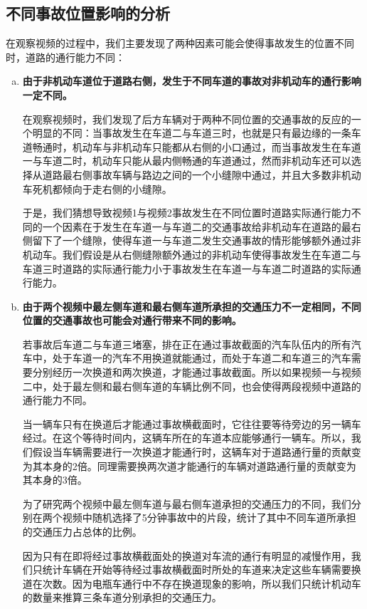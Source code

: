 \documentclass{cumcmart}
\begin{document}
\subsection{不同事故位置影响的分析}

在观察视频的过程中，我们主要发现了两种因素可能会使得事故发生的位置不同时，道路的通行能力不同：


\begin{enumerate}[a)]
\item \textbf{由于非机动车道位于道路右侧，发生于不同车道的事故对非机动车的通行影响一定不同。}

在观察视频时，我们发现了后方车辆对于两种不同位置的交通事故的反应的一个明显的不同：当事故发生在车道二与车道三时，也就是只有最边缘的一条车道畅通时，机动车与非机动车只能都从右侧的小口通过，而当事故发生在车道一与车道二时，机动车只能从最内侧畅通的车道通过，然而非机动车还可以选择从道路最右侧事故车辆与路边之间的一个小缝隙中通过，并且大多数非机动车死机都倾向于走右侧的小缝隙。

于是，我们猜想导致视频1与视频2事故发生在不同位置时道路实际通行能力不同的一个因素在于发生在车道一与车道二的交通事故给非机动车在道路的最右侧留下了一个缝隙，使得车道一与车道二发生交通事故的情形能够额外通过非机动车。我们假设是从右侧缝隙额外通过的非机动车使得事故发生在车道二与车道三时道路的实际通行能力小于事故发生在车道一与车道二时道路的实际通行能力。


\item \textbf{由于两个视频中最左侧车道和最右侧车道所承担的交通压力不一定相同，不同位置的交通事故也可能会对通行带来不同的影响。}

若事故后车道二与车道三堵塞，排在正在通过事故截面的汽车队伍内的所有汽车中，处于车道一的汽车不用换道就能通过，而处于车道二和车道三的汽车需要分别经历一次换道和两次换道，才能通过事故截面。所以如果视频一与视频二中，处于最左侧和最右侧车道的车辆比例不同，也会使得两段视频中道路的通行能力不同。

当一辆车只有在换道后才能通过事故横截面时，它往往要等待旁边的另一辆车经过。在这个等待时间内，这辆车所在的车道本应能够通行一辆车。所以，我们假设当车辆需要进行一次换道才能通行时，这辆车对于道路通行量的贡献变为其本身的2倍。同理需要换两次道才能通行的车辆对道路通行量的贡献变为其本身的3倍。

为了研究两个视频中最左侧车道与最右侧车道承担的交通压力的不同，我们分别在两个视频中随机选择了5分钟事故中的片段，统计了其中不同车道所承担的交通压力占总体的比例。

因为只有在即将经过事故横截面处的换道对车流的通行有明显的减慢作用，我们只统计车辆在开始等待经过事故横截面时所处的车道来决定这些车辆需要换道在次数。因为电瓶车通行中不存在换道现象的影响，所以我们只统计机动车的数量来推算三条车道分别承担的交通压力。
\end{enumerate}
\end{document}
